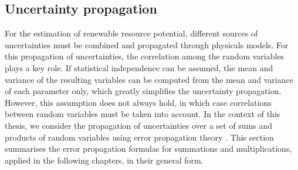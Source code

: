 \subsection{Uncertainty propagation}
\label{method_unc_prop}

For the estimation of renewable resource potential, different sources of uncertainties must be combined and propagated through physicals models. 
For this propagation of uncertainties, the correlation among the random variables plays a key role.
%
If statistical independence can be assumed, the mean and variance of the resulting variables can be computed from the mean and variance of each parameter only, which greatly simplifies the uncertainty propagation.
However, this assumption does not always hold, in which case correlations between random variables must be taken into account.
In the context of this thesis, we consider the propagation of uncertainties over a set of sums and products of random variables using error propagation theory \cite{jcgm_evaluation_2008, goodman_variance_1962}. This section summarises the error propagation formulas for summations and multiplications, applied in the following chapters, in their general form.

